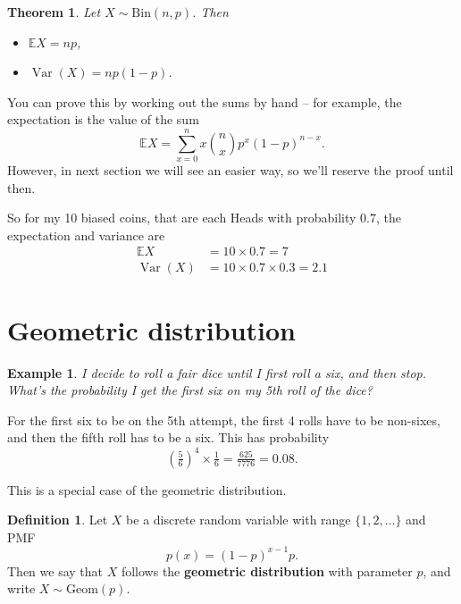 \documentclass[
  a4paper,
]{book}
\providecommand{\tightlist}{%
  \setlength{\itemsep}{0pt}\setlength{\parskip}{0pt}}
\newtheorem{theorem}{Theorem}[chapter]
\theoremstyle{definition}
\newtheorem{definition}{Definition}[chapter]
\theoremstyle{definition}
\newtheorem{example}{Example}[chapter]
\theoremstyle{definition}
\theoremstyle{definition}
\theoremstyle{remark}
\begin{document}
\begin{theorem}

Let \(X \sim \text{Bin}(n, p)\). Then

\begin{itemize}
\tightlist
\item
  \(\mathbb EX = np\),
\item
  \(\operatorname{Var}(X) =np(1-p)\).
\end{itemize}

\end{theorem}

You can prove this by working out the sums by hand -- for example, the expectation is the value of the sum
\[ \mathbb EX = \sum_{x=0}^n x \binom{n}{x} p^x (1-p)^{n-x} . \]
However, in next section we will see an easier way, so we'll reserve the proof until then.

So for my 10 biased coins, that are each Heads with probability \(0.7\), the expectation and variance are
\begin{align*}
  \mathbb EX &= 10 \times 0.7 = 7 \\
  \operatorname{Var}(X) &= 10 \times 0.7 \times 0.3 = 2.1
\end{align*}

\hypertarget{geometric}{%
\section{Geometric distribution}\label{geometric}}

\begin{example}
\emph{I decide to roll a fair dice until I first roll a six, and then stop. What's the probability I get the first six on my 5th roll of the dice?}

For the first six to be on the 5th attempt, the first 4 rolls have to be non-sixes, and then the fifth roll has to be a six. This has probability
\[ \left(\tfrac56\right)^4 \times  \tfrac16 = \tfrac{625}{7776} = 0.08.\]
\end{example}

This is a special case of the geometric distribution.

\begin{definition}
Let \(X\) be a discrete random variable with range \(\{1,2,\dots\}\) and PMF
\[ p(x) = (1-p)^{x-1}p . \]
Then we say that \(X\) follows the \textbf{geometric distribution} with parameter \(p\), and write \(X \sim \text{Geom}(p)\).
\end{definition}
\end{document}
